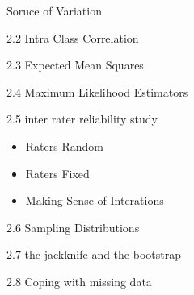 Soruce of Variation

2.2 Intra Class Correlation

2.3 Expected Mean Squares

2.4 Maximum Likelihood Estimators

2.5 inter rater reliability study

\begin{itemize}
\item Raters Random
\item Raters Fixed
\item Making Sense of Interations
\end{itemize}

2.6 Sampling Distributions


2.7 the jackknife and the bootstrap

2.8 Coping with missing data

